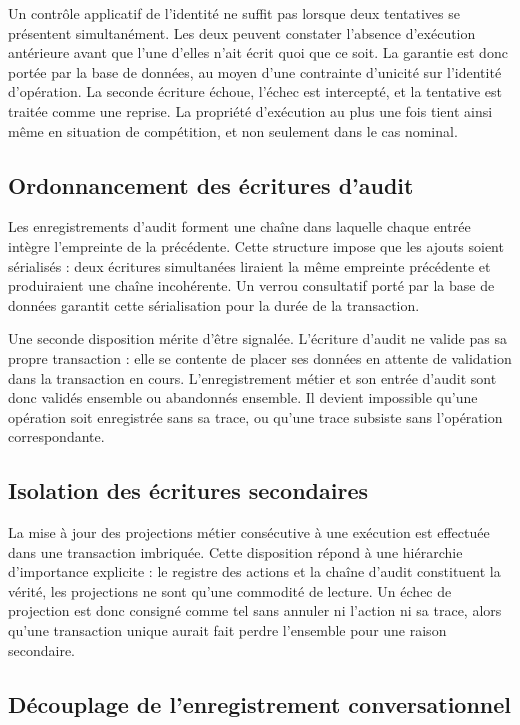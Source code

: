 Un contrôle applicatif de l'identité ne suffit pas lorsque deux tentatives se présentent simultanément. Les deux peuvent constater l'absence d'exécution antérieure avant que l'une d'elles n'ait écrit quoi que ce soit. La garantie est donc portée par la base de données, au moyen d'une contrainte d'unicité sur l'identité d'opération. La seconde écriture échoue, l'échec est intercepté, et la tentative est traitée comme une reprise. La propriété d'exécution au plus une fois tient ainsi même en situation de compétition, et non seulement dans le cas nominal.

\subsection{Ordonnancement des écritures d'audit}

Les enregistrements d'audit forment une chaîne dans laquelle chaque entrée intègre l'empreinte de la précédente. Cette structure impose que les ajouts soient sérialisés : deux écritures simultanées liraient la même empreinte précédente et produiraient une chaîne incohérente. Un verrou consultatif porté par la base de données garantit cette sérialisation pour la durée de la transaction.

Une seconde disposition mérite d'être signalée. L'écriture d'audit ne valide pas sa propre transaction : elle se contente de placer ses données en attente de validation dans la transaction en cours. L'enregistrement métier et son entrée d'audit sont donc validés ensemble ou abandonnés ensemble. Il devient impossible qu'une opération soit enregistrée sans sa trace, ou qu'une trace subsiste sans l'opération correspondante.

\subsection{Isolation des écritures secondaires}

La mise à jour des projections métier consécutive à une exécution est effectuée dans une transaction imbriquée. Cette disposition répond à une hiérarchie d'importance explicite : le registre des actions et la chaîne d'audit constituent la vérité, les projections ne sont qu'une commodité de lecture. Un échec de projection est donc consigné comme tel sans annuler ni l'action ni sa trace, alors qu'une transaction unique aurait fait perdre l'ensemble pour une raison secondaire.

\subsection{Découplage de l'enregistrement conversationnel}

